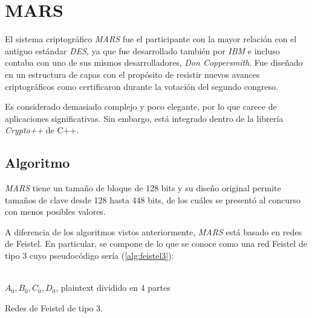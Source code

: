 \section{MARS}
\label{sec:MARS}

El sistema criptográfico \textit{MARS} fue el participante con la mayor relación con el antiguo estándar \textit{DES}, ya que fue desarrollado también por \textit{IBM} e incluso contaba con uno de sus mismos desarrolladores, \textit{Don Coppersmith}. Fue diseñado en un estructura de capas con el propósito de resistir nuevos avances criptográficos como certificaron durante la votación del segundo congreso.\cite{AES_process}

Es considerado demasiado complejo y poco elegante, por lo que carece de aplicaciones significativas. Sin embargo, está integrado dentro de la librería \textit{Crypto++}\cite{Crypto} de C++\cite{Implementations}.

\subsection{Algoritmo}
\textit{MARS} tiene un tamaño de bloque de 128 bits y su diseño original permite tamaños de clave desde 128 hasta 448 bits, de los cuáles se presentó al concurso con menos posibles valores.

A diferencia de los algoritmos vistos anteriormente, \textit{MARS} está basado en redes de Feistel. En particular, se compone de lo que se conoce como una red Feistel de tipo 3 cuyo pseudocódigo sería (\ref{alg:feistel3}):

\begin{algorithm}[H]
	\begin{algorithmic}[1]
		\REQUIRE \ \\
			\texttt{$A_0, B_0, C_0, D_0$}, plaintext dividido en 4 partes\\
		\ENDFOR
		
	\end{algorithmic}
	\caption{Redes de Feistel de tipo 3.}
	\label{alg:feistel3}
\end{algorithm}

